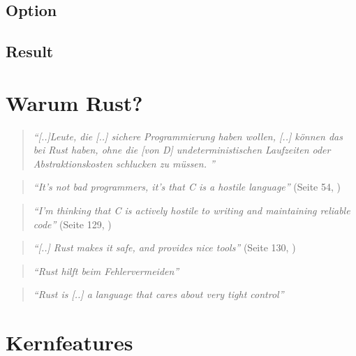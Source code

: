 \subsection{Option}
\subsection{Result}

\section{Warum Rust?}

\begin{quotation}
	\textit{\enquote{[..]Leute, die [..] sichere Programmierung haben wollen, [..] können das bei Rust haben, ohne die [von D] undeterministischen Laufzeiten oder Abstraktionskosten schlucken zu müssen. }}
	\cite{rust:fefe}
\end{quotation}




\begin{quotation}
	\textit{\enquote{It’s not bad programmers, it’s that C is a hostile language}} 
	(Seite 54, \cite{rust:c_is_hostile_mena})
\end{quotation}

\begin{quotation}
	\textit{\enquote{I’m thinking that C is actively hostile to writing and maintaining reliable code}} 
	(Seite 129, \cite{rust:c_is_hostile_mena})
\end{quotation}

\begin{quotation}
	\textit{\enquote{[..] Rust makes it safe, and  provides nice tools}} 
	(Seite 130, \cite{rust:c_is_hostile_mena})
\end{quotation}


\begin{quotation}
	\textit{\enquote{Rust hilft beim Fehlervermeiden}} 
	\cite{rust:c_is_hostile_golem}
\end{quotation}


\begin{quotation}
	\textit{\enquote{Rust is [..] a language that cares about very tight control}}
	\cite{rust:tight_control}
\end{quotation}

 \cite{rust:orly_y_rust}

\section{Kernfeatures}

